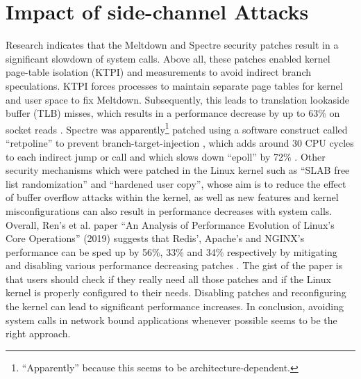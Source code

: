 \section{Impact of side-channel Attacks}
Research indicates that the Meltdown and Spectre security patches result in a significant slowdown of system calls. Above all, these patches enabled kernel page-table isolation (KTPI) and measurements to avoid indirect branch speculations. KTPI forces processes to maintain separate page tables for kernel and user space to fix Meltdown. Subsequently, this leads to translation lookaside buffer (TLB) misses, which results in a performance decrease by up to 63\% on socket reads \cite{acm:linux_perf}. Spectre was apparently\footnote{“Apparently” because this seems to be architecture-dependent.} patched using a software construct called “retpoline” to prevent branch-target-injection \cite{turner:retpoline}, which adds around 30 CPU cycles to each indirect jump or call and which slows down “epoll” by 72\% \cite{acm:linux_perf}. Other security mechanisms which were patched in the Linux kernel such as “SLAB free list randomization” and “hardened user copy”, whose aim is to reduce the effect of buffer overflow attacks within the kernel, as well as new features and kernel misconfigurations can also result in performance decreases with system calls. Overall, Ren’s et al. paper “An Analysis of Performance Evolution of Linux's Core Operations” (2019) suggests that Redis’, Apache’s and NGINX’s performance can be sped up by 56\%, 33\% and 34\% respectively by mitigating and disabling various performance decreasing patches \cite{acm:linux_perf}. \newline
The gist of the paper is that users should check if they really need all those patches and if the Linux kernel is properly configured to their needs. Disabling patches and reconfiguring the kernel can lead to significant performance increases. \newline
In conclusion, avoiding system calls in network bound applications whenever possible seems to be the right approach. 

